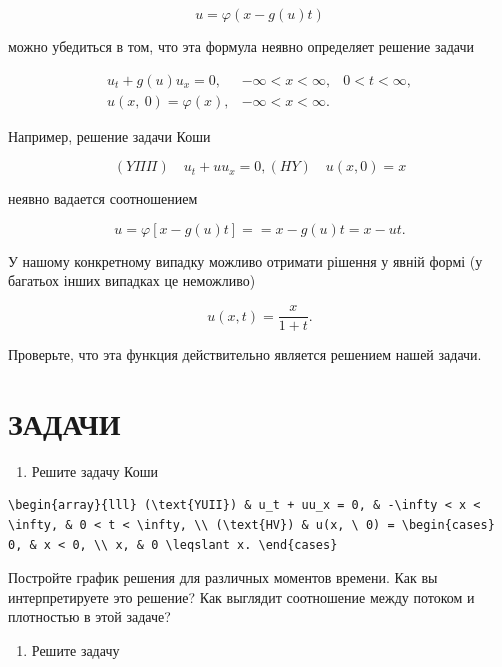 \documentclass[
  ukrainian,
]{article}
\providecommand{\tightlist}{%
  \setlength{\itemsep}{0pt}\setlength{\parskip}{0pt}}
\begin{document}
\[
u = \varphi(x - g(u) t)
\]

можно убедиться в том, что эта формула неявно определяет решение задачи

\[
\begin{array}{ll} u_t + g\left(u\right) u_x = 0, & -\infty < x < \infty, & 0 < t < \infty, \\ u\left(x, \ 0\right) = \varphi\left(x\right), & -\infty < x < \infty. \end{array}
\]

Например, решение задачи Коши

\[
(Y\Pi\Pi) \quad u_t + uu_x = 0,
(HY) \quad u(x, 0) = x
\]

неявно вадается соотношением

\[
u = \varphi [x - g(u) t] =
= x - g(u) t = x - ut.
\]

У нашому конкретному випадку можливо отримати рішення у явній формі (у
багатьох інших випадках це неможливо)

\[
u(x, t) = \frac{x}{1+t}.
\]

Проверьте, что эта функция действительно является решением нашей задачи.

\section{\texorpdfstring{\textbf{ЗАДАЧИ}}{ЗАДАЧИ}}\label{ux437ux430ux434ux430ux447ux438}

\begin{enumerate}
\def\labelenumi{\arabic{enumi}.}
\tightlist
\item
  Решите задачу Коши
\end{enumerate}

\begin{verbatim}
\begin{array}{lll} (\text{YUII}) & u_t + uu_x = 0, & -\infty < x < \infty, & 0 < t < \infty, \\ (\text{HV}) & u(x, \ 0) = \begin{cases} 0, & x < 0, \\ x, & 0 \leqslant x. \end{cases}
\end{verbatim}

Постройте график решения для различных моментов времени. Как вы
интерпретируете это решение? Как выглядит соотношение между потоком и
плотностью в этой задаче?

\begin{enumerate}
\def\labelenumi{\arabic{enumi}.}
\setcounter{enumi}{1}
\tightlist
\item
  Решите задачу
\end{enumerate}
\end{document}
